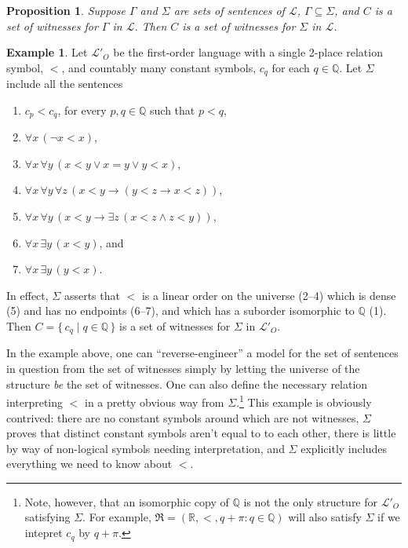 \documentclass[12pt]{amsbook}
\theoremstyle{plain}
\newtheorem{prop}[thm]{Proposition}
\theoremstyle{definition}
\newtheorem{exmp}{Example}[chapter]
\theoremstyle{remark}
\begin{document}
\begin{prop} \label{p:eight14}
Suppose $\Gamma$ and $\Sigma$ are sets of sentences of $\mathcal{L}$,  $\Gamma \subseteq \Sigma$,  and $C$ is a set of witnesses for $\Gamma$ in $\mathcal{L}$.  Then $C$ is a set of witnesses for $\Sigma$ in $\mathcal{L}$. 
\end{prop}

\begin{exmp} \label{e:rw}
Let $\mathcal{L}'_O$ be the first-order language with a single 2-place relation symbol,  $<$,  and countably many constant symbols,  $c_q$ for each $q \in \mathbb{Q}$.  Let $\Sigma$ include all the sentences
\begin{enumerate}
\item $c_p < c_q$,  for every $p,q \in \mathbb{Q}$ such that $p < q$,
\item $\forall x\, (\lnot x < x)$,
\item $\forall x\, \forall y\, (x < y \lor x = y \lor y < x)$,
\item $\forall x\, \forall y\, \forall z\, (x < y \to (y < z \to x < z))$,
\item $\forall x\, \forall y\, (x < y \to \exists z\, (x < z \land z < y))$,
\item $\forall x\, \exists y\, (x < y)$,  and 
\item $\forall x\, \exists y\, (y < x)$.
\end{enumerate}
In effect,  $\Sigma$ asserts that $<$ is a linear order on the universe (2--4) which is dense (5) and has no endpoints (6--7),  and which has a suborder isomorphic to $\mathbb{Q}$ (1).  Then $C = \{\, c_q \mid q \in \mathbb{Q} \,\}$ is a set of witnesses for $\Sigma$ in $\mathcal{L}'_O$.
\end{exmp}

In the example above,  one can ``reverse-engineer'' a model for the set of sentences in question from the set of witnesses simply by letting the universe of the structure {\em be\/} the set of witnesses.  One can also define the necessary relation interpreting $<$ in a pretty obvious way from $\Sigma$.\footnote{Note,  however,  that an isomorphic copy of $\mathbb{Q}$ is not the only structure for $\mathcal{L}'_O$ satisfying $\Sigma$.  For example,  $\mathfrak{R} = (\mathbb{R},<, q + \pi \colon q \in \mathbb{Q})$ will also satisfy $\Sigma$ if we intepret $c_q$ by $q + \pi$.}  This example is obviously contrived:  there are no constant symbols around which are not witnesses,  $\Sigma$ proves that distinct constant symbols aren't equal to to each other,  there is little by way of non-logical symbols needing interpretation,  and $\Sigma$ explicitly includes everything we need to know about $<$.  
\end{document}
